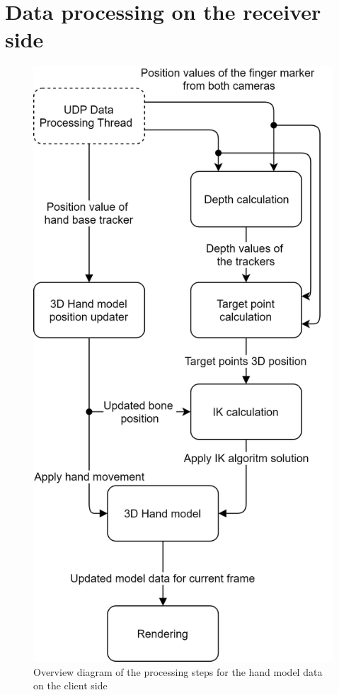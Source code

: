 \section{Data processing on the receiver side}
\begin{figure}
\label{img:hand_model_workflow}
\includegraphics[width=\textwidth/2]{images/Rendering_workflow.png} 
\caption{Overview diagram of the processing steps for the hand model data on the client side}
\end{figure}
